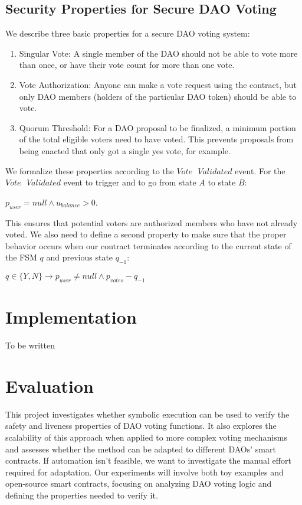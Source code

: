 \documentclass[conference]{IEEEtran}
\begin{document}
\subsection{Security Properties for Secure DAO Voting}
We describe three basic properties for a secure DAO voting system:
\begin{enumerate}
    \item Singular Vote: A single member of the DAO should not be able to vote more than once, or have their vote count for more than one vote.
    \item Vote Authorization: Anyone can make a vote request using the contract, but only DAO members (holders of the particular DAO token) should be able to vote.
    \item Quorum Threshold: For a DAO proposal to be finalized, a minimum portion of the total eligible voters need to have voted. This prevents proposals from being enacted that only got a single yes vote, for example.
\end{enumerate}

We formalize these properties according to the $Vote\mbox{ }Validated$ event.
For the $Vote\mbox{ }Validated$ event to trigger and to go from state $A$ to state $B$:
\begin{center}
$p_{user} = null \land u_{balance} > 0$. 
\end{center}
This ensures that potential voters are authorized members who have not already voted. We also need to define a second property to make sure that the proper behavior occurs when our contract terminates according to the current state of the FSM $q$ and previous state $q_{-1}$:
\begin{center}
    $q \in\{Y,N\}\xrightarrow{}p_{user} \neq null \land p_{votes} - q_{-1}$
\end{center}


\section{Implementation}
To be written


\section{Evaluation}

This project investigates whether symbolic execution can be used to verify the safety and liveness properties of DAO voting functions. It also explores the scalability of this approach when applied to more complex voting mechanisms and assesses whether the method can be adapted to different DAOs' smart contracts. If automation isn't feasible, we want to investigate the manual effort required for adaptation. Our experiments will involve both toy examples and open-source smart contracts, focusing on analyzing DAO voting logic and defining the properties needed to verify it.
\end{document}
